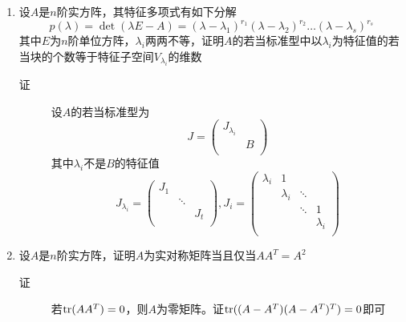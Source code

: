 \begin{enumerate}
\item 设$A$是$n$阶实方阵，其特征多项式有如下分解
\[
p(\lambda) = \det(\lambda E-A)=(\lambda-\lambda_1)^{r_1}(\lambda-\lambda_2)^{r_2}\dots(\lambda-\lambda_s)^{r_s}
\]
其中$E$为$n$阶单位方阵，$\lambda_i$两两不等，证明$A$的若当标准型中以$\lambda_i$为特征值的若当块的个数等于特征子空间$V_{\lambda_i}$的维数
\begin{description}
\item[证] 设$A$的若当标准型为
\[
J = \left(
\begin{array}{cc}
J_{\lambda_i} & \\
 & B \\
\end{array}\right)
\]
其中$\lambda_i$不是$B$的特征值
\[
J_{\lambda_i} = \left(
\begin{array}{ccc}
J_1 & & \\
 & \ddots & \\
 & & J_t\\
\end{array}\right),J_i = \left(
\begin{array}{cccc}
\lambda_i & 1 & & \\
 & \lambda_i & \ddots & \\
 & & \ddots & 1 \\
 & & & \lambda_i \\
\end{array}\right)
\]
\end{description}

\item 设$A$是$n$阶实方阵，证明$A$为实对称矩阵当且仅当$AA^T=A^2$
\begin{description}
\item[证] 若$\operatorname{tr}(AA^T)=0$，则$A$为零矩阵。证$\operatorname{tr}((A-A^T)(A-A^T)^T)=0$即可
\end{description}



























\end{enumerate}